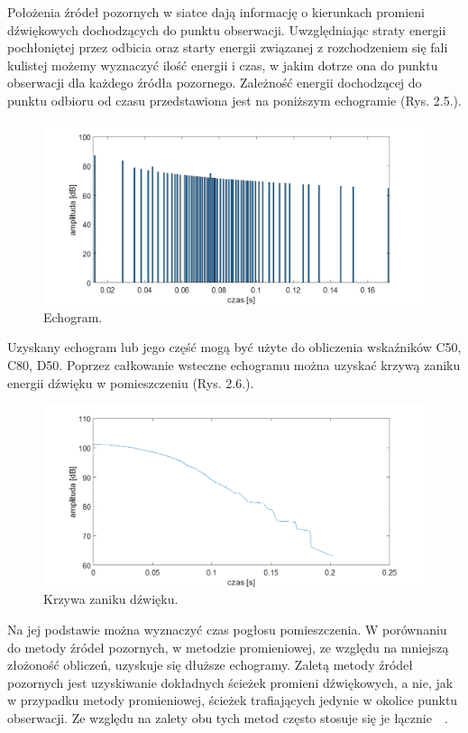 Położenia  źródeł pozornych w siatce dają informację o kierunkach promieni dźwiękowych dochodzących do punktu obserwacji. Uwzględniając straty energii pochłoniętej przez odbicia oraz starty energii związanej z rozchodzeniem się fali kulistej możemy wyznaczyć  ilość energii i czas, w jakim dotrze ona do punktu obserwacji dla każdego źródła pozornego. Zależność energii dochodzącej do punktu odbioru od czasu przedstawiona jest na poniższym echogramie (Rys. 2.5.).

\begin{figure}[h]
        \centering
                \centering
                \includegraphics[width=16cm]{rys5}
	\caption{Echogram.}
\end{figure}

Uzyskany echogram lub jego część mogą być użyte do obliczenia wskaźników C50, C80, D50. Poprzez całkowanie wsteczne echogramu można uzyskać krzywą zaniku energii dźwięku w pomieszczeniu (Rys. 2.6.).

\begin{figure}[h]
        \centering
                \centering
                \includegraphics[width=16cm]{rys6}
	\caption{Krzywa zaniku dźwięku.}
\end{figure}

Na jej podstawie można wyznaczyć czas pogłosu pomieszczenia. W porównaniu do metody źródeł pozornych, w metodzie promieniowej, ze względu na mniejszą złożoność obliczeń, uzyskuje się dłuższe echogramy. Zaletą metody źródeł pozornych jest uzyskiwanie dokładnych ścieżek promieni dźwiękowych, a nie, jak w przypadku metody promieniowej, ścieżek trafiających jedynie w okolice punktu obserwacji. Ze względu na zalety obu tych metod często stosuje się je łącznie~\cite{b13}~\cite{b14}.















